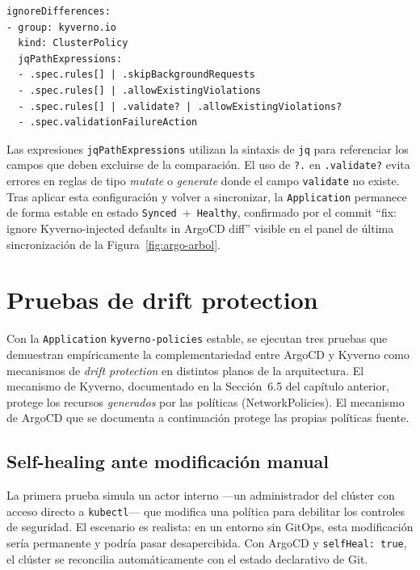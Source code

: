 \begin{lstlisting}
ignoreDifferences:
- group: kyverno.io
  kind: ClusterPolicy
  jqPathExpressions:
  - .spec.rules[] | .skipBackgroundRequests
  - .spec.rules[] | .allowExistingViolations
  - .spec.rules[] | .validate? | .allowExistingViolations?
  - .spec.validationFailureAction
\end{lstlisting}

Las expresiones \texttt{jqPathExpressions} utilizan la sintaxis de \texttt{jq} para referenciar los campos que deben excluirse de la comparación. El uso de \texttt{?.} en \texttt{.validate?} evita errores en reglas de tipo \textit{mutate} o \textit{generate} donde el campo \texttt{validate} no existe. Tras aplicar esta configuración y volver a sincronizar, la \texttt{Application} permanece de forma estable en estado \texttt{Synced}~+~\texttt{Healthy}, confirmado por el commit ``fix: ignore Kyverno-injected defaults in ArgoCD diff'' visible en el panel de última sincronización de la Figura~\ref{fig:argo-arbol}.

\section{Pruebas de drift protection}

Con la \texttt{Application} \texttt{kyverno-policies} estable, se ejecutan tres pruebas que demuestran empíricamente la complementariedad entre ArgoCD y Kyverno como mecanismos de \textit{drift protection} en distintos planos de la arquitectura. El mecanismo de Kyverno, documentado en la Sección~6.5 del capítulo anterior, protege los recursos \textit{generados} por las políticas (NetworkPolicies). El mecanismo de ArgoCD que se documenta a continuación protege las propias políticas fuente.

\subsection{Self-healing ante modificación manual}

La primera prueba simula un actor interno —un administrador del clúster con acceso directo a \texttt{kubectl}— que modifica una política para debilitar los controles de seguridad. El escenario es realista: en un entorno sin GitOps, esta modificación sería permanente y podría pasar desapercibida. Con ArgoCD y \texttt{selfHeal:\,true}, el clúster se reconcilia automáticamente con el estado declarativo de Git.


